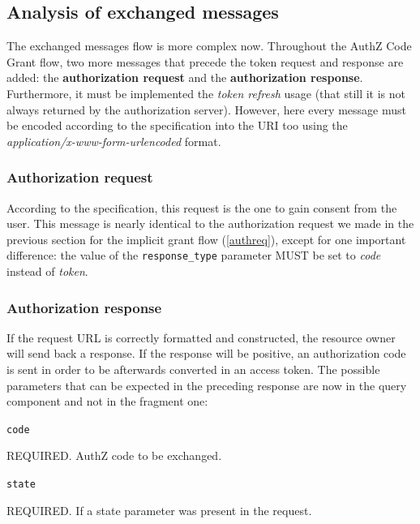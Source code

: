 \vspace{1cm}

\subsection{Analysis of exchanged messages}
The exchanged messages flow is more complex now. Throughout the AuthZ Code Grant flow, two more messages that precede the token request and response are added: the \textbf{authorization request} and the \textbf{authorization response}. Furthermore, it must be implemented the \textit{token refresh} usage (that still it is not always returned by the authorization server). However, here every message must be encoded according to the specification into the URI too using the \textit{application/x-www-form-urlencoded} format.

\subsubsection{Authorization request}

According to the specification, this request is the one to gain consent from the user. This message is nearly identical to the authorization request we made in the previous section for the implicit grant flow (\ref{authreq}), except for one important difference: the value of the \texttt{response\_type} parameter MUST be set to \textit{code} instead of \textit{token}.

\subsubsection{Authorization response}
If the request URL is correctly formatted and constructed, the resource owner will send back a response. If the response will be positive, an authorization code is sent in order to be afterwards converted in an access token.
The possible parameters that can be expected in the preceding response are now in the query component and not in the fragment one:

\texttt{code}

\hspace{0.5cm}REQUIRED. AuthZ code to be exchanged.

\texttt{state}

\hspace{0.5cm}REQUIRED. If a state parameter was present in the request.

\vspace{0.5cm}

